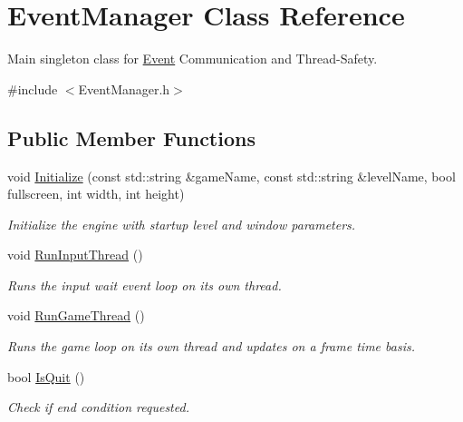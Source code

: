 \hypertarget{classEventManager}{}\section{Event\+Manager Class Reference}
\label{classEventManager}


Main singleton class for \hyperlink{classEvent}{Event} Communication and Thread-\/\+Safety.  




{\ttfamily \#include $<$Event\+Manager.\+h$>$}

\subsection*{Public Member Functions}
\begin{DoxyCompactItemize}
\item 
void \hyperlink{classEventManager_adca26b2660ef0b92509334eddfacf271}{Initialize} (const std\+::string \&game\+Name, const std\+::string \&level\+Name, bool fullscreen, int width, int height)
\begin{DoxyCompactList}\small\item\em Initialize the engine with startup level and window parameters. \end{DoxyCompactList}\item 
\mbox{\label{classEventManager_af60686b5d689043da47c3620cee4e262}} 
void \hyperlink{classEventManager_af60686b5d689043da47c3620cee4e262}{Run\+Input\+Thread} ()
\begin{DoxyCompactList}\small\item\em Runs the input wait event loop on its own thread. \end{DoxyCompactList}\item 
\mbox{\label{classEventManager_a6a2500c028c89fb05e12015e26b6cc21}} 
void \hyperlink{classEventManager_a6a2500c028c89fb05e12015e26b6cc21}{Run\+Game\+Thread} ()
\begin{DoxyCompactList}\small\item\em Runs the game loop on its own thread and updates on a frame time basis. \end{DoxyCompactList}\item 
bool \hyperlink{classEventManager_a59a5258ef9924dedb12f1b35df8cd5cd}{Is\+Quit} ()
\begin{DoxyCompactList}\small\item\em Check if end condition requested. \end{DoxyCompactList}\item 

\end{DoxyCompactItemize}
